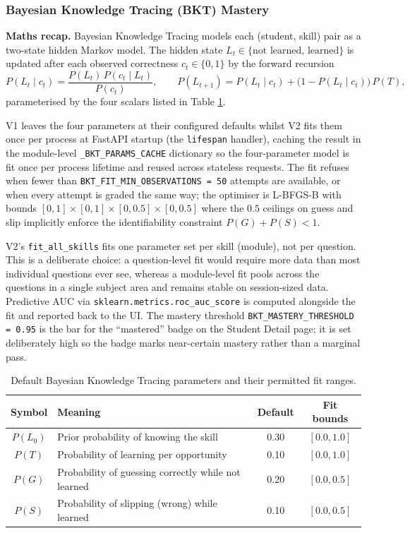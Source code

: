 \subsubsection{Bayesian Knowledge Tracing (BKT) Mastery}

\textbf{Maths recap.}
Bayesian Knowledge Tracing \cite{corbettKnowledgeTracingModeling1995} models each (student, skill) pair as a two-state hidden Markov model.
The hidden state $L_t \in \{\text{not learned},\, \text{learned}\}$ is updated after each observed correctness $c_t \in \{0, 1\}$ by the forward recursion
\[
P(L_t \mid c_t) = \frac{P(L_t)\, P(c_t \mid L_t)}{P(c_t)}, \qquad
P(L_{t+1}) = P(L_t \mid c_t) + \big(1 - P(L_t \mid c_t)\big)\, P(T),
\]
parameterised by the four scalars listed in Table \ref{tab:bkt-defaults}.

V1 leaves the four parameters at their configured defaults whilst V2 fits them once per process at FastAPI startup (the \texttt{lifespan} handler), caching the result in the module-level \texttt{\_BKT\_PARAMS\_CACHE} dictionary so the four-parameter model is fit once per process lifetime and reused across stateless requests.
The fit refuses when fewer than \texttt{BKT\_FIT\_MIN\_OBSERVATIONS = 50} attempts are available, or when every attempt is graded the same way; the optimiser is L-BFGS-B with bounds $[0, 1] \times [0, 1] \times [0, 0.5] \times [0, 0.5]$ where the $0.5$ ceilings on guess and slip implicitly enforce the identifiability constraint $P(G) + P(S) < 1$.

V2's \texttt{fit\_all\_skills} fits one parameter set per skill (module), not per question.
This is a deliberate choice: a question-level fit would require more data than most individual questions ever see, whereas a module-level fit pools across the questions in a single subject area and remains stable on session-sized data.
Predictive AUC via \texttt{sklearn.metrics.roc\_auc\_score} is computed alongside the fit and reported back to the UI.
The mastery threshold \texttt{BKT\_MASTERY\_THRESHOLD = 0.95} is the bar for the ``mastered'' badge on the Student Detail page; it is set deliberately high so the badge marks near-certain mastery rather than a marginal pass.

\begin{table}[H]
\centering
\caption{Default Bayesian Knowledge Tracing parameters and their permitted fit ranges.}
\label{tab:bkt-defaults}
\small
\begin{tabular}{|c|p{}|c|c|}
\hline
\textbf{Symbol} & \textbf{Meaning} & \textbf{Default} & \textbf{Fit bounds} \\
\hline\hline
$P(L_0)$ & Prior probability of knowing the skill                    & 0.30 & $[0.0, 1.0]$ \\
\hline
$P(T)$   & Probability of learning per opportunity                   & 0.10 & $[0.0, 1.0]$ \\
\hline
$P(G)$   & Probability of guessing correctly while not learned       & 0.20 & $[0.0, 0.5]$ \\
\hline
$P(S)$   & Probability of slipping (wrong) while learned             & 0.10 & $[0.0, 0.5]$ \\
\hline
\end{tabular}
\end{table}


